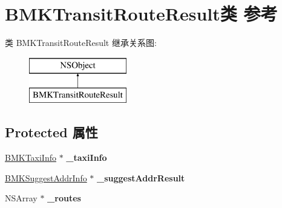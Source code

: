 \hypertarget{interface_b_m_k_transit_route_result}{}\section{B\+M\+K\+Transit\+Route\+Result类 参考}
\label{interface_b_m_k_transit_route_result}
类 B\+M\+K\+Transit\+Route\+Result 继承关系图\+:\begin{figure}[H]
\begin{center}
\leavevmode
\includegraphics[height=2.000000cm]{interface_b_m_k_transit_route_result}
\end{center}
\end{figure}
\subsection*{Protected 属性}
\begin{DoxyCompactItemize}
\item 
\hypertarget{interface_b_m_k_transit_route_result_ae443891449bb1e950302c880fa70256f}{}\hyperlink{interface_b_m_k_taxi_info}{B\+M\+K\+Taxi\+Info} $\ast$ {\bfseries \+\_\+taxi\+Info}\label{interface_b_m_k_transit_route_result_ae443891449bb1e950302c880fa70256f}

\item 
\hypertarget{interface_b_m_k_transit_route_result_a10b93b18a6b3009f5f871bc6f54b2403}{}\hyperlink{interface_b_m_k_suggest_addr_info}{B\+M\+K\+Suggest\+Addr\+Info} $\ast$ {\bfseries \+\_\+suggest\+Addr\+Result}\label{interface_b_m_k_transit_route_result_a10b93b18a6b3009f5f871bc6f54b2403}

\item 
\hypertarget{interface_b_m_k_transit_route_result_a0e197c7e3c3992c90a40ab4ee4b966f1}{}N\+S\+Array $\ast$ {\bfseries \+\_\+routes}\label{interface_b_m_k_transit_route_result_a0e197c7e3c3992c90a40ab4ee4b966f1}

\end{DoxyCompactItemize}
